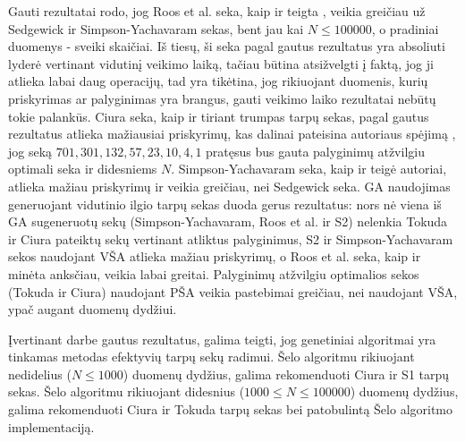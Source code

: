\documentclass{VUMIFInfKursinis}
\begin{document}
Gauti rezultatai rodo, jog Roos et al. seka, kaip ir teigta \cite{roos2002genetic},
veikia greičiau už Sedgewick ir Simpson-Yachavaram sekas, bent jau kai $N \leq 100000$, o pradiniai duomenys - sveiki skaičiai.
Iš tiesų, ši seka pagal gautus rezultatus yra absoliuti lyderė vertinant vidutinį veikimo laiką, tačiau būtina atsižvelgti į faktą, jog ji atlieka labai daug operacijų,
tad yra tikėtina, jog rikiuojant duomenis, kurių priskyrimas ar palyginimas yra brangus, gauti veikimo laiko rezultatai nebūtų tokie palankūs.
Ciura seka, kaip ir tiriant trumpas tarpų sekas, pagal gautus rezultatus atlieka mažiausiai priskyrimų, kas dalinai pateisina autoriaus spėjimą \cite{ciura2001best},
jog seką $701,301,132,57,23,10,4,1$ pratęsus bus gauta palyginimų atžvilgiu optimali seka ir didesniems $N$.
Simpson-Yachavaram seka, kaip ir teigė \cite{simpson1999faster} autoriai, atlieka mažiau priskyrimų ir veikia greičiau, nei Sedgewick seka.
GA naudojimas generuojant vidutinio ilgio tarpų sekas duoda gerus rezultatus: nors nė viena iš GA sugeneruotų sekų (Simpson-Yachavaram, Roos et al. ir S2) nelenkia Tokuda ir Ciura pateiktų sekų
vertinant atliktus palyginimus, S2 ir Simpson-Yachavaram sekos naudojant VŠA atlieka mažiau priskyrimų, o Roos et al. seka, kaip ir minėta anksčiau, veikia labai greitai. 
Palyginimų atžvilgiu optimalios sekos (Tokuda ir Ciura) naudojant PŠA veikia pastebimai greičiau, nei naudojant VŠA, ypač augant duomenų dydžiui.


Įvertinant darbe gautus rezultatus, galima teigti, jog genetiniai algoritmai yra tinkamas metodas efektyvių tarpų sekų radimui.
Šelo algoritmu rikiuojant nedidelius ($N \leq 1000$) duomenų dydžius, galima rekomenduoti Ciura ir S1 tarpų sekas.
Šelo algoritmu rikiuojant didesnius ($1000 \leq N \leq 100000$) duomenų dydžius, galima rekomenduoti Ciura ir Tokuda tarpų sekas bei patobulintą Šelo algoritmo implementaciją.



\printbibliography[heading=bibintoc] %

\appendix  %
\end{document}

